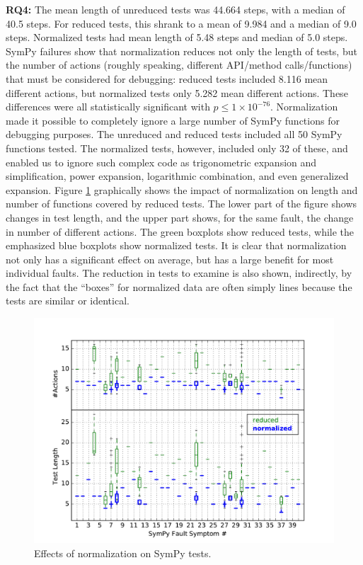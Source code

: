 {\bf RQ4:} The mean length of unreduced tests was 44.664 steps, with a median
of 40.5 steps.  For reduced tests, this shrank to a mean of
9.984 and a median of 9.0 steps.  Normalized tests had mean length of
5.48 steps and median of 5.0 steps.  SymPy failures show
that normalization reduces not only the length of tests, but the number of
actions (roughly speaking, different API/method calls/functions) that must be considered for debugging:  reduced tests included
8.116 mean different actions, but normalized tests only 5.282
mean different actions.  These differences were all statistically
significant with $p\leq1\times10^{-76}$.  
Normalization made it possible to completely ignore a large number of
SymPy functions for debugging purposes.  The unreduced and reduced
tests included all 50 SymPy functions tested.  The normalized tests,
however, included only 32 of these, and enabled us to ignore such
complex code as trigonometric expansion and simplification, power expansion,
logarithmic combination, and even generalized expansion.  Figure
\ref{lengthandactions} graphically shows the impact of normalization
on length and number of functions covered by reduced tests.  The lower
part of the figure shows changes in test length, and the upper part
shows, for the same fault, the change in number of different actions.
The green boxplots show reduced tests, while the emphasized blue
boxplots show normalized tests.  It is clear that normalization not
only has a significant effect on average, but has a large benefit for
most individual faults.  The reduction in tests to examine
is also shown, indirectly, by the fact that the ``boxes'' for
normalized data are often simply lines because the tests are similar or identical.


\begin{figure}
\includegraphics[width=\columnwidth]{sympyd}
\caption{Effects of normalization on SymPy tests.}
\label{lengthandactions}
\end{figure}

